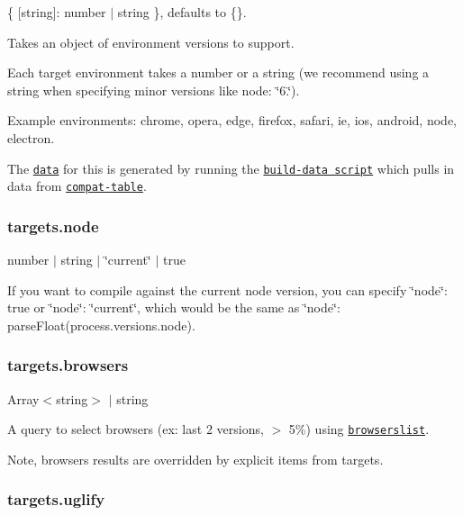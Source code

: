 {\ttfamily \{ \mbox{[}string\mbox{]}\+: number $\vert$ string \}}, defaults to {\ttfamily \{\}}.

Takes an object of environment versions to support.

Each target environment takes a number or a string (we recommend using a string when specifying minor versions like {\ttfamily node\+: \char`\"{}6.\char`\"{}}).

Example environments\+: {\ttfamily chrome}, {\ttfamily opera}, {\ttfamily edge}, {\ttfamily firefox}, {\ttfamily safari}, {\ttfamily ie}, {\ttfamily ios}, {\ttfamily android}, {\ttfamily node}, {\ttfamily electron}.

The \href{https://github.com/babel/babel-preset-env/blob/master/data/plugins.json}{\tt data} for this is generated by running the \href{https://github.com/babel/babel-preset-env/blob/master/scripts/build-data.js}{\tt build-\/data script} which pulls in data from \href{https://kangax.github.io/compat-table}{\tt compat-\/table}.

\subsubsection*{{\ttfamily targets.\+node}}

{\ttfamily number $\vert$ string $\vert$ \char`\"{}current\char`\"{} $\vert$ true}

If you want to compile against the current node version, you can specify {\ttfamily \char`\"{}node\char`\"{}\+: true} or {\ttfamily \char`\"{}node\char`\"{}\+: \char`\"{}current\char`\"{}}, which would be the same as {\ttfamily \char`\"{}node\char`\"{}\+: parse\+Float(process.\+versions.\+node)}.

\subsubsection*{{\ttfamily targets.\+browsers}}

{\ttfamily Array$<$string$>$ $\vert$ string}

A query to select browsers (ex\+: last 2 versions, $>$ 5\%) using \href{https://github.com/ai/browserslist}{\tt browserslist}.

Note, browsers\textquotesingle{} results are overridden by explicit items from {\ttfamily targets}.

\subsubsection*{{\ttfamily targets.\+uglify}}

